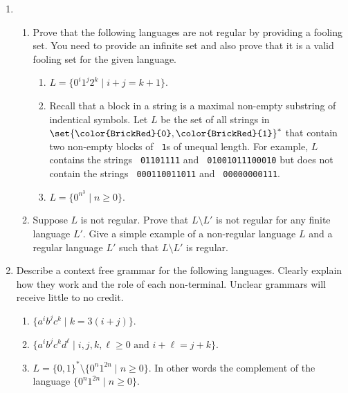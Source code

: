 \documentclass[11pt]{article}
\def\Sym#1{\texttt{\upshape \color{BrickRed} {#1}}}
\begin{document}
\vspace{1cm}

\begin{enumerate}


\item
  \begin{enumerate}
  \item Prove that the following languages are not regular by providing
  a fooling set. You need to provide an infinite set and
  also prove that it is a valid fooling set for the given language.
  \begin{enumerate}
  \item $L = \{0^i1^j2^k \mid i+j = k+1\}$.
  \item Recall that a block in a string is a maximal non-empty
    substring of indentical symbols. Let $L$ be the set of all strings
    in $\set{\Sym0,\Sym1}^*$ that contain two non-empty blocks of \Sym1s of
    unequal length.  For example, $L$ contains the strings
    \Sym{01101111} and \Sym{01001011100010} but does not contain the
    strings \Sym{000110011011} and \Sym{00000000111}.
  \item $L = \{0^{n^3} \mid n \ge 0\}$.
  \end{enumerate}
\item Suppose $L$ is not regular. Prove that $L \setminus L'$ is not
  regular for any finite language $L'$. Give a simple example of a
  non-regular language $L$ and a regular language $L'$ such that $L
  \setminus L'$ is regular.
  \end{enumerate}

\item Describe a context free grammar for the following languages.
Clearly explain how they work and the role of each non-terminal.
Unclear grammars will receive little to no credit.
\begin{enumerate}
\item $\{a^ib^jc^k \mid k = 3(i+j)\}$.
\item $\{a^ib^jc^kd^\ell \mid  i,j,k,\ell \ge 0 \mbox{~and~} i+\ell = j+k\}$.
\item $L = \{0,1\}^* \setminus \{ 0^n1^{2n} \mid n \ge 0\}$. In other words
the complement of the language $\{ 0^n1^{2n} \mid n \ge 0\}$.
\end{enumerate}


\end{enumerate}
\end{document}
